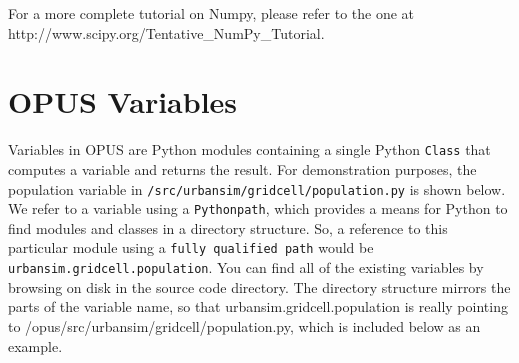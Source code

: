 For a more complete tutorial on Numpy, please refer to the one at http://www.scipy.org/Tentative\_NumPy\_Tutorial.

\section{OPUS Variables}
\label{sec:variables}

Variables in OPUS are Python modules containing a single Python \verb#Class# that computes a variable and returns the result.  For demonstration purposes, the population variable in \verb#/src/urbansim/gridcell/population.py# is shown below.  We refer to a variable using a \verb#Pythonpath#, which provides a means for Python to find modules and classes in a directory structure.  So, a reference to this particular module using a \verb#fully qualified path# would be \verb#urbansim.gridcell.population#.  You can find all of the existing variables by browsing on disk in the source code directory.  The directory structure mirrors the parts of the variable name, so that urbansim.gridcell.population is really pointing to /opus/src/urbansim/gridcell/population.py, which is included below as an example.

